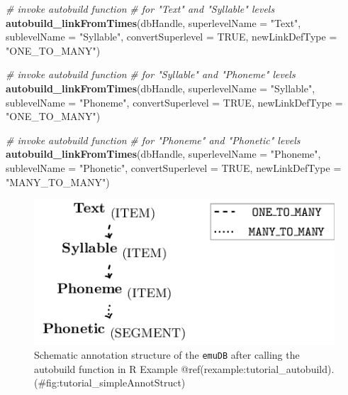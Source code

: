 \documentclass[]{book}
\newenvironment{Shaded}{\begin{snugshade}}{\end{snugshade}}
\newcommand{\KeywordTok}[1]{\textcolor[rgb]{0.13,0.29,0.53}{\textbf{{#1}}}}
\newcommand{\DataTypeTok}[1]{\textcolor[rgb]{0.13,0.29,0.53}{{#1}}}
\newcommand{\StringTok}[1]{\textcolor[rgb]{0.31,0.60,0.02}{{#1}}}
\newcommand{\CommentTok}[1]{\textcolor[rgb]{0.56,0.35,0.01}{\textit{{#1}}}}
\newcommand{\OtherTok}[1]{\textcolor[rgb]{0.56,0.35,0.01}{{#1}}}
\newcommand{\NormalTok}[1]{{#1}}
\theoremstyle{definition}
\theoremstyle{definition}
\theoremstyle{definition}
\theoremstyle{remark}
\begin{document}
\begin{Shaded}
\begin{Highlighting}[]
\CommentTok{# invoke autobuild function}
\CommentTok{# for "Text" and "Syllable" levels}
\KeywordTok{autobuild_linkFromTimes}\NormalTok{(dbHandle,}
                        \DataTypeTok{superlevelName =} \StringTok{"Text"}\NormalTok{,}
                        \DataTypeTok{sublevelName =} \StringTok{"Syllable"}\NormalTok{,}
                        \DataTypeTok{convertSuperlevel =} \OtherTok{TRUE}\NormalTok{,}
                        \DataTypeTok{newLinkDefType =} \StringTok{"ONE_TO_MANY"}\NormalTok{)}

\CommentTok{# invoke autobuild function}
\CommentTok{# for "Syllable" and "Phoneme" levels}
\KeywordTok{autobuild_linkFromTimes}\NormalTok{(dbHandle,}
                        \DataTypeTok{superlevelName =} \StringTok{"Syllable"}\NormalTok{,}
                        \DataTypeTok{sublevelName =} \StringTok{"Phoneme"}\NormalTok{,}
                        \DataTypeTok{convertSuperlevel =} \OtherTok{TRUE}\NormalTok{,}
                        \DataTypeTok{newLinkDefType =} \StringTok{"ONE_TO_MANY"}\NormalTok{)}

\CommentTok{# invoke autobuild function}
\CommentTok{# for "Phoneme" and "Phonetic" levels}
\KeywordTok{autobuild_linkFromTimes}\NormalTok{(dbHandle,}
                        \DataTypeTok{superlevelName =} \StringTok{"Phoneme"}\NormalTok{,}
                        \DataTypeTok{sublevelName =} \StringTok{"Phonetic"}\NormalTok{,}
                        \DataTypeTok{convertSuperlevel =} \OtherTok{TRUE}\NormalTok{,}
                        \DataTypeTok{newLinkDefType =} \StringTok{"MANY_TO_MANY"}\NormalTok{)}
\end{Highlighting}
\end{Shaded}

\begin{figure}
\centering
\includegraphics{pics/tut_simpleAnnotStruct.png}
\caption{Schematic annotation structure of the \texttt{emuDB} after
calling the autobuild function in R Example
@ref(rexample:tutorial\_autobuild).(\#fig:tutorial\_simpleAnnotStruct)}
\end{figure}
\end{document}
